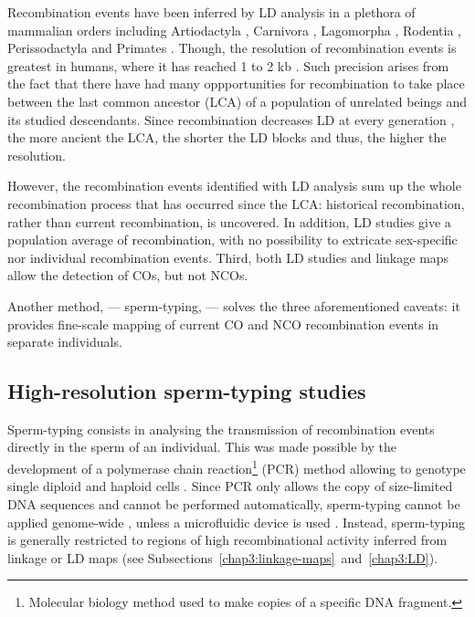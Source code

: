 Recombination events have been inferred by LD analysis in a plethora of mammalian orders including Artiodactyla \citep{farnir2000extensive,mcrae2002linkage,nsengimana2004linkage}, Carnivora \citep{menotti-raymond1999genetic,sutter2004extensive,verardi2006detecting}, Lagomorpha \citep{carneiro2011genetic}, Rodentia \citep{brunschwig2012finescale}, Perissodactyla \citep{corbin2010linkage, mccue2012high} and Primates \citep{auton2012finescale}.
Though, the resolution of recombination events is greatest in humans, where it has reached 1 to 2 kb \citep{theinternationalhapmapconsortium2007seconda, hinch2011landscape, the1000genomesprojectconsortium2015global}.
Such precision arises from the fact that there have had many oppportunities for recombination to take place between the last common ancestor (LCA) of a population of unrelated beings and its studied descendants.
Since recombination decreases LD at every generation \citep{slatkin2008linkage}, the more ancient the LCA, the shorter the LD blocks and thus, the higher the resolution.

However, the recombination events identified with LD analysis sum up the whole recombination process that has occurred since the LCA\@: historical recombination, rather than current recombination, is uncovered.
In addition, LD studies give a population average of recombination, with no possibility to extricate sex-specific nor individual recombination events.
Third, both LD studies and linkage maps allow the detection of COs, but not NCOs.

Another method, — sperm-typing, — solves the three aforementioned caveats: it provides fine-scale mapping of current CO and NCO recombination events in separate individuals.



\subsection{High-resolution sperm-typing studies}%

Sperm-typing consists in analysing the transmission of recombination events directly in the sperm of an individual.
This was made possible by the development of a polymerase chain reaction\footnote{Molecular biology method used to make copies of a specific DNA fragment.} (PCR) method allowing to genotype single diploid and haploid cells \citep{li1988amplification}.
Since PCR only allows the copy of size-limited DNA sequences and cannot be performed automatically, sperm-typing cannot be applied genome-wide \citep{coop2008highresolution}, unless a microfluidic device is used \citep{fan2011wholegenome,wang2012genomewide}.
Instead, sperm-typing is generally restricted to regions of high recombinational activity inferred from linkage or LD maps (see Subsections~\ref{chap3:linkage-maps}~and~\ref{chap3:LD}).\\

